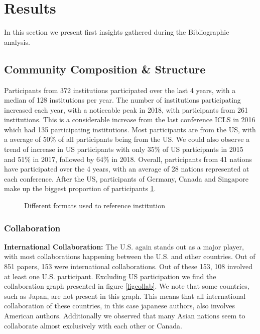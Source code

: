 \documentclass[article,twocolumn]{IEEEtran}
\begin{document}
    \hypertarget{results}{%
\section{Results}\label{results}}

In this section we present first insights gathered during the
Bibliographic analysis.


    \hypertarget{community-composition-structure}{%
\subsection{Community Composition \&
Structure}\label{community-composition-structure}}

Participants from 372 institutions participated over the last 4 years,
with a median of 128 institutions per year. The number of institutions
participating increased each year, with a noticeable peak in 2018, with
participants from 261 institutions. This is a considerable increase from
the last conference ICLS in 2016 which had 135 participating
institutions. Most participants are from the US, with a average of 50\%
of all participants being from the US. We could also observe a trend of
increase in US participants with only 35\% of US participants in 2015
and 51\% in 2017, followed by 64\% in 2018. Overall, participants from
41 nations have participated over the 4 years, with an average of 28
nations represented at each conference. After the US, participants of
Germany, Canada and Singapore make up the biggest proportion of
participants \ref{figrep}.


    \begin{figure}
        \begin{center}\end{center}
        \caption{Different formats used to reference institution}
        \label{figrep}
    \end{figure}
    
    \hypertarget{collaboration}{%
\subsubsection{Collaboration}\label{collaboration}}

\textbf{International Collaboration:} The U.S. again stands out as a
major player, with most collaborations happening between the U.S. and
other countries. Out of 851 papers, 153 were international
collaborations. Out of these 153, 108 involved at least one U.S.
participant. Excluding US participation we find the collaboration graph
presented in figure \ref{figcollab}. We note that some countries, such
as Japan, are not present in this graph. This means that all
international collaboration of these countries, in this case japanese
authors, also involves American authors. Additionally we observed that
many Asian nations seem to collaborate almost exclusively with each
other or Canada.
\end{document}
